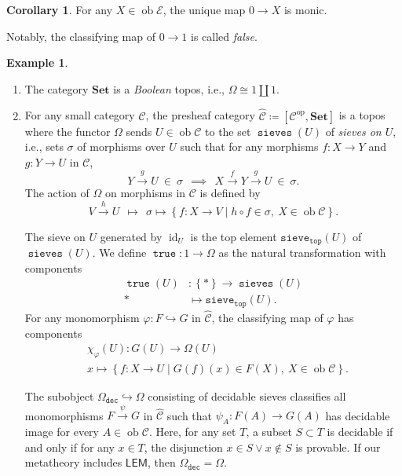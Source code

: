 \documentclass[10pt,letterpaper,cm]{nupset}
\theoremstyle{definition}
\newtheorem{exmp}[definition]{Example}
\theoremstyle{theorem}
\newtheorem{corollary}[definition]{Corollary}
\theoremstyle{remark}
\newcommand{\1}{\mathbf{1}}
\renewcommand{\c}{\mathscr{C}}
\newcommand{\e}{\mathscr{E}}
\newcommand{\0}{\vec 0}
\DeclareMathOperator{\id}{id}
\DeclareMathOperator{\true}{\mathtt{true}}
\DeclareMathOperator{\sieves}{\mathtt{sieves}}
\DeclareMathOperator{\op}{op}
\DeclareMathOperator{\ob}{ob}
\newcommand{\be}{\begin{enumerate}}
\newcommand{\ee}{\end{enumerate}}
\begin{document}
\begin{corollary}
For any $X \in \ob{\e}$, the unique map $0 \to X$ is monic.
\end{corollary}

Notably, the classifying map of $0 \to 1$ is called \textit{false}.


\smallskip

\begin{exmp} $ $
\be
\item The category $\mathbf{Set}$ is a \textit{Boolean} topos, i.e., $\Omega \cong 1 \coprod 1$. 
\item For any small category $\c$, the presheaf category $\widehat{\c} \coloneqq \left[ \c^{\op}, \mathbf{Set}\right]$ is a topos where the functor $\Omega$ sends $U \in \ob{\c}$ to the set $\sieves(U)$ of \textit{sieves on $U$}, i.e., sets $\sigma$ of morphisms over $U$ such that for any morphisms $f : X \to Y$ and $g : Y \to U$ in $\c$,
\[
Y \xrightarrow{g} U \  \in \ \sigma \ \ \implies \ \  X \xrightarrow{f} Y \xrightarrow{g} U \ \in \ \sigma 
.\] 
The action of $\Omega$ on morphisms in $\c$ is defined by
\[
V \xrightarrow{h} U  \ \  \mapsto \ \  \sigma \mapsto \left\{f : X \to V \mid h \circ f \in \sigma, \ X \in \ob{\c}    \right\}   
.\]

The sieve on $U$ generated by  $\id_U$ is the top element $\mathtt{sieve}_{\mathtt{top}}(U)$ of $\sieves(U)$. We define $\true : 1 \to \Omega$ as  the natural transformation with components
\begin{align*}
\true(U) & : \left\{\ast\right\} \to \sieves(U)
\\ \ast & \mapsto \mathtt{sieve}_{\mathtt{top}}(U).
\end{align*}
For any monomorphism $\varphi: F \hookrightarrow G$ in $\widehat{\c}$, the classifying map of $\varphi$ has components
\begin{align*}
& \chi_{\varphi}(U)  : G(U) \to \Omega(U)
\\ & x  \mapsto  \left\{f : X \to U \mid G(f)(x) \in  F(X),\ X \in \ob{\c}   \right\}.
\end{align*}

The subobject $\Omega_{\mathtt{dec}} \hookrightarrow \Omega$ consisting of decidable sieves classifies all monomorphisms $F \xrightarrow{\psi} G$ in $\widehat{\c}$ such that $\psi_A : F(A) \to G(A)$ has decidable image for every $A \in \ob{\c}$. Here, for any set $T$, a subset $S \subset T$ is decidable if and only if for any $x \in T$, the disjunction $x \in S \vee x \notin S$ is provable. If our metatheory includes $\mathsf{LEM}$, then $\Omega_{\mathtt{dec}} = \Omega$.
\ee
\end{exmp}
\end{document}
